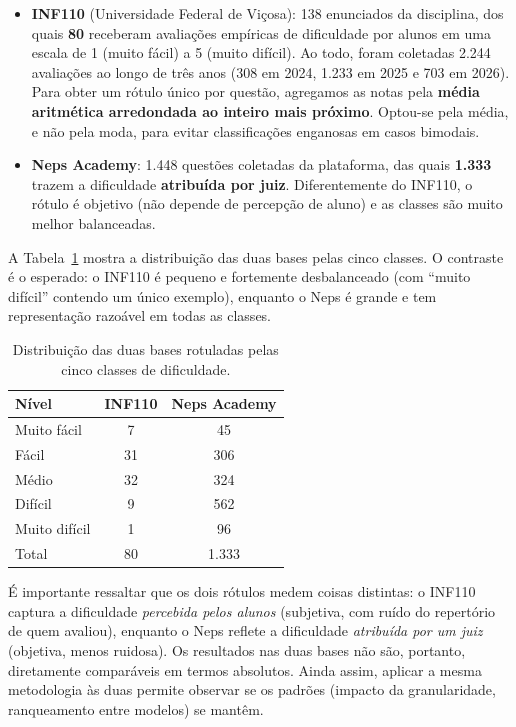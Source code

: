 \documentclass[sigconf]{webmedia}
\begin{document}
\begin{itemize}
  \item \textbf{INF110} (Universidade Federal de Viçosa): 138 enunciados da disciplina, dos quais \textbf{80} receberam avaliações empíricas de dificuldade por alunos em uma escala de 1 (muito fácil) a 5 (muito difícil). Ao todo, foram coletadas 2.244 avaliações ao longo de três anos (308 em 2024, 1.233 em 2025 e 703 em 2026). Para obter um rótulo único por questão, agregamos as notas pela \textbf{média aritmética arredondada ao inteiro mais próximo}. Optou-se pela média, e não pela moda, para evitar classificações enganosas em casos bimodais.
  \item \textbf{Neps Academy}: 1.448 questões coletadas da plataforma, das quais \textbf{1.333} trazem a dificuldade \textbf{atribuída por juiz}. Diferentemente do INF110, o rótulo é objetivo (não depende de percepção de aluno) e as classes são muito melhor balanceadas.
\end{itemize}

A Tabela~\ref{tab:bases} mostra a distribuição das duas bases pelas cinco classes. O contraste é o esperado: o INF110 é pequeno e fortemente desbalanceado (com ``muito difícil'' contendo um único exemplo), enquanto o Neps é grande e tem representação razoável em todas as classes.

\begin{table}[t]
  \caption{Distribuição das duas bases rotuladas pelas cinco classes de dificuldade.}
  \label{tab:bases}
  \begin{tabular}{lcc}
    \toprule
    Nível & INF110 & Neps Academy \\
    \midrule
    Muito fácil    & 7   & 45    \\
    Fácil          & 31  & 306   \\
    Médio          & 32  & 324   \\
    Difícil        & 9   & 562   \\
    Muito difícil  & 1   & 96    \\
    \midrule
    Total          & 80  & 1.333 \\
    \bottomrule
  \end{tabular}
\end{table}

É importante ressaltar que os dois rótulos medem coisas distintas: o INF110 captura a dificuldade \emph{percebida pelos alunos} (subjetiva, com ruído do repertório de quem avaliou), enquanto o Neps reflete a dificuldade \emph{atribuída por um juiz} (objetiva, menos ruidosa). Os resultados nas duas bases não são, portanto, diretamente comparáveis em termos absolutos. Ainda assim, aplicar a mesma metodologia às duas permite observar se os padrões (impacto da granularidade, ranqueamento entre modelos) se mantêm.
\end{document}
